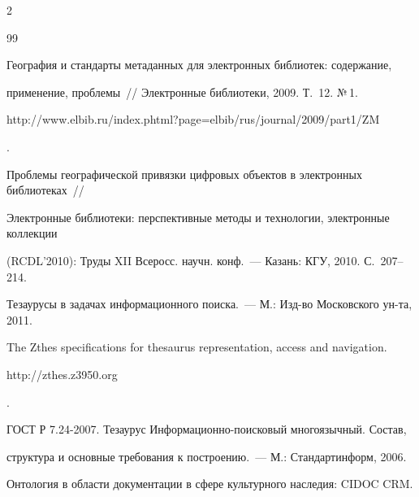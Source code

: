 \begin{multicols}{2}
{\small\frenchspacing

{%


\begin{thebibliography}{99}

  



География и стандарты метаданных для электронных библиотек: содержание, 

применение, проблемы~// Электронные библиотеки, 2009. Т.~12. №\,1. {\sf 

http://www.elbib.ru/\linebreak index.phtml?page=elbib/rus/journal/2009/part1/\linebreak ZM}.





Проблемы географической привязки цифровых объектов в электронных библиотеках~// 

Электронные библиотеки: перспективные методы и технологии, электронные коллекции 

(RCDL'2010): Труды XII Всеросс. научн. конф.~--- Казань: КГУ, 2010. С.~207--214.





Тезаурусы в задачах информационного поиска.~--- М.: Изд-во Московского ун-та, 2011.




The Zthes specifications for thesaurus representation, access and navigation. {\sf 

http://zthes.z3950.org}.




ГОСТ Р 7.24-2007. Тезаурус Ин\-фор\-ма\-ци\-он\-но-по\-иско\-вый многоязычный. Состав, 

структура и основные требования к построению.~--- М.: Стандартинформ, 2006.




Онтология в области документации в сфере культурного наследия: CIDOC CRM. {\sf 

}
\end{thebibliography}}}
\end{multicols}
